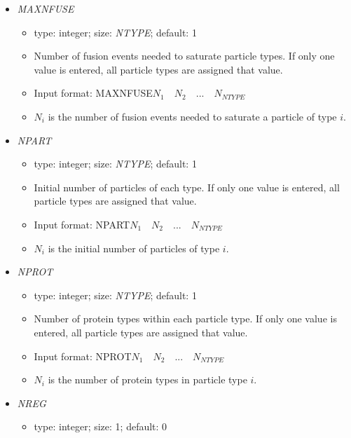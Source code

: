 \documentclass[12pt]{article}
\begin{document}
\begin{itemize}
\begin{itemize}
		\item Rate of pausing for all particle types. If only one value is entered, all particle types are assigned that pause rate. 
		\item Input format: KSTOP\quad$k_{1}\quad k_{2}\quad...\quad k_{NTYPE}$
		\item $k_{i}$ is the rate at which particle type $i$ pauses moving.
	\end{itemize}
%
\item {\it MAXNFUSE}
	\begin{itemize}
		\item  type: integer; size: \textit{NTYPE}; default: 1
		\item Number of fusion events needed to saturate particle types. If only one value is entered, all particle types are assigned that value.
		\item Input format: MAXNFUSE\quad$N_{1}\quad N_{2}\quad...\quad N_{NTYPE}$
		\item $N_{i}$ is the number of fusion events needed to saturate a particle of type $i$.
	\end{itemize}  
%
\item {\it NPART}
	\begin{itemize}
		\item  type: integer; size: \textit{NTYPE}; default: 1
		\item Initial number of particles of each type. If only one value is entered, all particle types are assigned that value.
		\item Input format: NPART\quad$N_{1}\quad N_{2}\quad...\quad N_{NTYPE}$
		\item $N_{i}$ is the initial number of particles of type $i$.
	\end{itemize}   
%
\item {\it NPROT}
	\begin{itemize}
		\item  type: integer; size: \textit{NTYPE}; default: 1
		\item Number of protein types within each particle type. If only one value is entered, all particle types are assigned that value.
		\item Input format: NPROT\quad$N_{1}\quad N_{2}\quad...\quad N_{NTYPE}$
		\item $N_{i}$ is the number of protein types in particle type $i$.
	\end{itemize}
%
\item {\it NREG}
\begin{itemize}
	\item  type: integer; size: 1; default: 0

\end{itemize}
\end{itemize}
\end{document}
